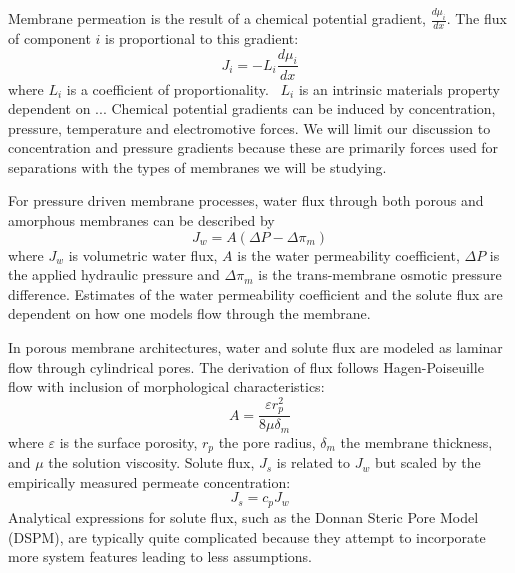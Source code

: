   Membrane permeation is the result of a chemical potential gradient, $\frac{d\mu_i}{dx}$.
  The flux of component $i$ is proportional to this gradient:
  \begin{equation}
    J_i = -L_i \frac{d\mu_i}{dx}
  \end{equation}
  where $L_i$ is a coefficient of proportionality.~\cite{wijmans_solution-diffusion_1995}
  $L_i$ is an intrinsic materials property dependent on ... %
  Chemical potential gradients can be induced by concentration, pressure, temperature
  and electromotive forces. We will limit our discussion to concentration and pressure
  gradients because these are primarily forces used for separations with the types of 
  membranes we will be studying.

  For pressure driven membrane processes, water flux through both porous and 
  amorphous membranes can be described by
  \begin{equation}
  J_w = A(\Delta P - \Delta \pi_m)
  \end{equation}
  where $J_w$ is volumetric water flux, $A$ is the water permeability coefficient,
  $\Delta P$ is the applied hydraulic pressure and $\Delta \pi_m$ is the 
  trans-membrane osmotic pressure difference. Estimates of the water permeability 
  coefficient and the solute flux are dependent on how one models flow through the 
  membrane.

  In porous membrane architectures, water and solute flux are modeled as laminar flow
  through cylindrical pores. The derivation of flux follows Hagen-Poiseuille flow with 
  inclusion of morphological characteristics:~\cite{baker_membrane_2012}
  \begin{equation}
    A = \frac{\varepsilon r_p^2}{8\mu\delta_m}
  \end{equation}
  where $\varepsilon$ is the surface porosity, $r_p$ the pore radius, $\delta_m$ the
  membrane thickness, and $\mu$ the solution viscosity. Solute flux, $J_s$ is related
  to $J_w$ but scaled by the empirically measured permeate concentration:
  \begin{equation}
    J_s = c_p J_w
  \end{equation}
  Analytical expressions for solute flux, such as the Donnan Steric Pore Model (DSPM), 
  are typically quite complicated because they attempt to incorporate more system features
  leading to less assumptions.~\cite{bowen_modelling_2002}
  
